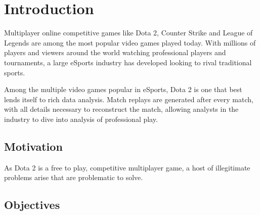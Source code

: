 \documentclass[Report.tex]{subfiles}
\begin{document}
\section{Introduction}
Multiplayer online competitive games like Dota 2, Counter Strike and League of Legends are among the most popular video games played today. With millions of players and viewers around the world watching professional players and tournaments, a large eSports industry has developed looking to rival traditional sports. 

Among the multiple video games popular in eSports, Dota 2 is one that best lends itself to rich data analysis. Match replays are generated after every match, with all details necessary to reconstruct the match, allowing analysts in the industry to dive into analysis of professional play. 

\subsection{Motivation}
As Dota 2 is a free to play, competitive multiplayer game, a host of illegitimate  problems arise that are problematic to solve. 

\subsection{Objectives}




\end{document}
